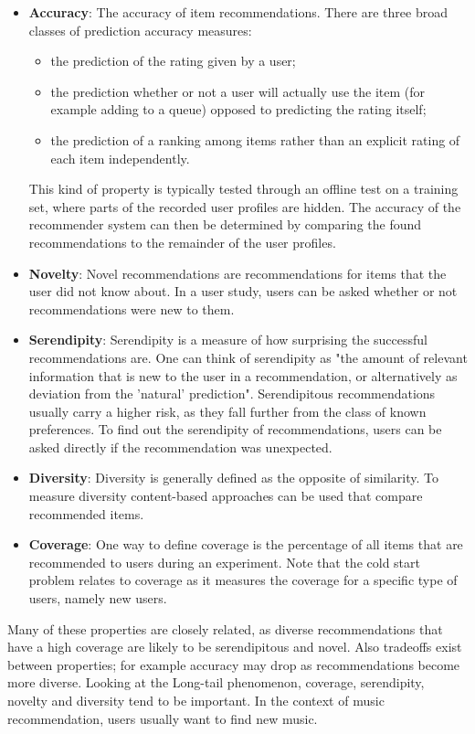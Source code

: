 \begin{itemize}
	\item \textbf{Accuracy}: The accuracy of item recommendations. There are three broad classes of prediction accuracy measures:
	\begin{itemize}
		\item the prediction of the rating given by a user;
		\item the prediction whether or not a user will actually use the item (for example adding to a queue) opposed to predicting the rating itself;
		\item the prediction of a ranking among items rather than an explicit rating of each item independently.
	\end{itemize}
	This kind of property is typically tested through an offline test on a training set, where parts of the recorded user profiles are hidden. The accuracy of the recommender system can then be determined by comparing the found recommendations to the remainder of the user profiles.
	\item \textbf{Novelty}: Novel recommendations are recommendations for items that the user did not know about. In a user study, users can be asked whether or not recommendations were new to them.
	\item \textbf{Serendipity}: Serendipity is a measure of how surprising the successful recommendations are. One can think of serendipity as "the amount of relevant information that is new to the user in a recommendation, or alternatively as deviation from the 'natural' prediction"\cite{shani:2011:9780387858197}. Serendipitous recommendations usually carry a higher risk, as they fall further from the class of known preferences. To find out the serendipity of recommendations, users can be asked directly if the recommendation was unexpected.
	\item \textbf{Diversity}: Diversity is generally defined as the opposite of similarity. To measure diversity content-based approaches can be used that compare recommended items.
	\item \textbf{Coverage}: One way to define coverage is the percentage of all items that are recommended to users during an experiment. Note that the cold start problem relates to coverage as it measures the coverage for a specific type of users, namely new users.
\end{itemize}

Many of these properties are closely related, as diverse recommendations that have a high coverage are likely to be serendipitous and novel. Also tradeoffs exist between properties; for example accuracy may drop as recommendations become more diverse\cite{shani:2011:9780387858197}. Looking at the Long-tail phenomenon, coverage, serendipity, novelty and diversity tend to be important. In the context of music recommendation, users usually want to find new music\cite{levy:2010}.


